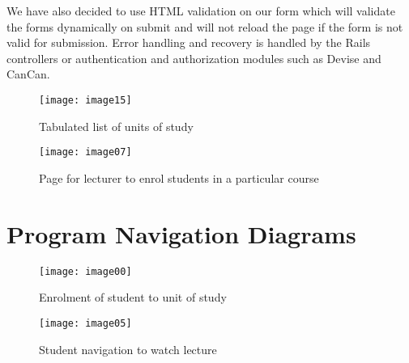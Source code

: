 \documentclass{article}
\begin{document}
We have also decided to use HTML validation on our form which will validate the forms dynamically on submit and will not reload the page if the form is not valid for submission. Error handling and recovery is handled by the Rails controllers or authentication and authorization modules such as Devise and CanCan.

\begin{figure}[h!]
\centering
\texttt{[image: image15]}
\caption{Tabulated list of units of study}
\end{figure}


\begin{figure}[h!]
\centering
\texttt{[image: image07]}
\caption{Page for lecturer to enrol students in a particular course}
\end{figure}

\clearpage
\section{Program Navigation Diagrams}
\begin{figure}[h!]
\centering
\texttt{[image: image00]}
\caption{Enrolment of student to unit of study}
\end{figure}

\begin{figure}[h!]
\centering
\texttt{[image: image05]}
\caption{Student navigation to watch lecture}
\end{figure}

\clearpage
\end{document}
